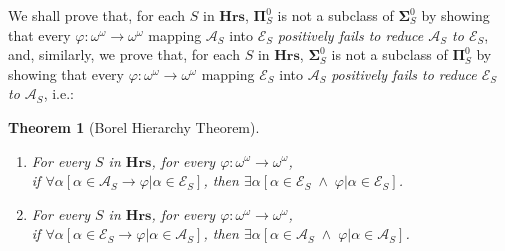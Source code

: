 \documentclass[a4paper]{amsart}
\theoremstyle{plain}
\newtheorem{theorem}{Theorem}
\begin{document}
 We shall prove that, for each $S$ in $\mathbf{Hrs}$, $\mathbf{\Pi}^0_S$ is not a subclass of $\mathbf{\Sigma}^0_S$ by showing that every $\varphi:\omega^\omega\rightarrow\omega^\omega$ mapping $\mathcal{A}_S$ into $\mathcal{E}_S$ {\it positively fails to reduce $\mathcal{A}_S$ to $\mathcal{E}_S$}, and, similarly, we prove that, for each $S$ in $\mathbf{Hrs}$, $\mathbf{\Sigma}^0_S$ is not a subclass of $\mathbf{\Pi}^0_S$ by showing that every $\varphi:\omega^\omega\rightarrow\omega^\omega$ mapping $\mathcal{E}_S$ into $\mathcal{A}_S$ {\it positively fails to reduce $\mathcal{E}_S$ to $\mathcal{A}_S$}, i.e.:
 
 
 \begin{theorem}[Borel Hierarchy Theorem]\label{T:bht}
 $\;$ \begin{enumerate}[\upshape (i)] \item For every  $S$ in $\mathbf{Hrs}$, for every $\varphi:\omega^\omega\rightarrow\omega^\omega$, \\if $\forall\alpha[\alpha \in \mathcal{A}_S\rightarrow \varphi|\alpha \in \mathcal{E}_S]$, then $\exists \alpha[\alpha \in \mathcal{E}_S \;\wedge\; \varphi|\alpha \in \mathcal{E}_S]$.
 
 \item For every  $S$ in $\mathbf{Hrs}$, for every $\varphi:\omega^\omega\rightarrow\omega^\omega$, \\if $\forall\alpha[\alpha \in \mathcal{E}_S\rightarrow \varphi|\alpha \in \mathcal{A}_S]$, then $\exists \alpha[\alpha \in \mathcal{A}_S \;\wedge\; \varphi|\alpha \in \mathcal{A}_S]$.  \end{enumerate} \end{theorem}
 
\end{document}
